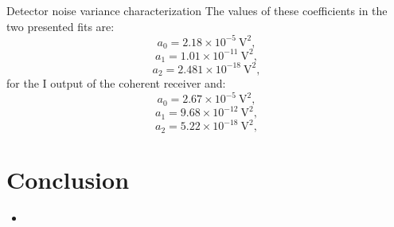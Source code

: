 \documentclass{beamer}
\begin{document}
\begin{frame}[t]{Detector noise variance characterization}
The values of these coefficients in the two presented fits are:
$$a_0=2.18\times10^{-5}~\text{V}^2,$$
$$a_1=1.01\times10^{-11}~\text{V}^2,$$
$$a_2=2.481\times10^{-18}~\text{V}^2,$$
for the I output of the coherent receiver and:
$$a_0=2.67\times10^{-5}~\text{V}^2,$$
$$a_1=9.68\times10^{-12}~\text{V}^2,$$
$$a_2=5.22\times10^{-18}~\text{V}^2,$$
\end{frame}




\section{Conclusion}
\begin{frame}[t]
\begin{itemize}
\item 
\end{itemize}
\end{frame}
\end{document}

